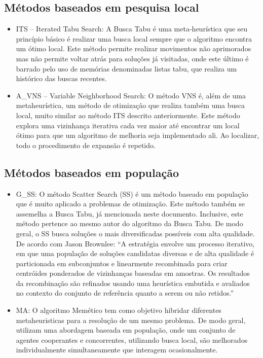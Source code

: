 \documentclass[12pt]{article}
\begin{document}
\subsection{Métodos baseados em pesquisa local}

\begin{itemize}
    \item ITS – Iterated Tabu Search: A Busca Tabu é uma meta-heurística que seu princípio básico é realizar uma busca local sempre que o algoritmo encontra um ótimo local. Este método permite realizar movimentos não aprimorados mas não permite voltar atrás para soluções já visitadas, onde este último é barrado pelo uso de memórias denominadas listas tabu, que realiza um histórico das buscas recentes.
    \item A\_VNS – Variable Neighborhood Search: O método VNS é, além de uma metaheurística, um método de otimização que realiza também uma busca local, muito similar ao método ITS descrito anteriormente. Este método explora uma vizinhança iterativa cada vez maior até encontrar um local ótimo para que um algoritmo de melhoria seja implementado ali. Ao localizar, todo o procedimento de expansão é repetido.
\end{itemize}

\subsection{Métodos baseados em população}

\begin{itemize}
    \item G\_SS: O método Scatter Search (SS) é um método baseado em população que é muito aplicado a problemas de otimização. Este método também se assemelha a Busca Tabu, já mencionada neste documento. Inclusive, este método pertence ao mesmo autor do algoritmo da Busca Tabu. De modo geral, o SS busca soluções o mais diversificadas possíveis com alta qualidade. De acordo com Jason Brownlee: “A estratégia envolve um processo iterativo, em que uma população de soluções candidatas diversas e de alta qualidade é particionada em subconjuntos e linearmente recombinada para criar centróides ponderados de vizinhanças baseadas em amostras. Os resultados da recombinação são refinados usando uma heurística embutida e avaliados no contexto do conjunto de referência quanto a serem ou não retidos.”
    \item MA: O algoritmo Memético tem como objetivo hibridar diferentes metaheuristicas para a resolução de um mesmo problema.  De modo geral, utilizam uma abordagem baseada em população, onde um conjunto de agentes cooperantes e concorrentes, utilizando busca local, são melhorados individualmente simultaneamente que interagem ocasionalmente.
\end{itemize}
\end{document}
